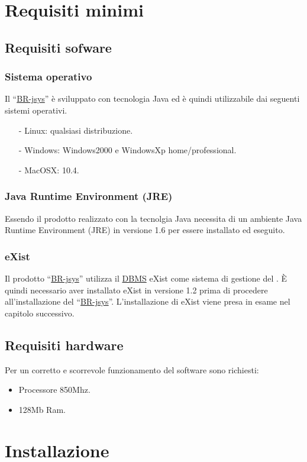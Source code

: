 \chapter{Requisiti minimi}
\section{Requisiti sofware }
\subsection{Sistema operativo}
Il ``\underline{BR-jsys}'' \`e sviluppato con tecnologia Java ed \`e quindi utilizzabile dai seguenti sistemi operativi.
\begin{itemize}
\item[-] Linux: qualsiasi distribuzione.
\item[-] Windows: Windows2000 e WindowsXp home/professional.
\item[-] MacOSX: 10.4.
\end{itemize}
\subsection{Java Runtime Environment (JRE)}
Essendo il prodotto realizzato con la tecnolgia Java necessita di un ambiente Java Runtime Environment (JRE) in versione 1.6 per essere installato ed eseguito.
\subsection{eXist}
Il prodotto ``\underline{BR-jsys}'' utilizza il \underline{DBMS} eXist come sistema di gestione del \rp. \`E quindi necessario aver installato eXist in versione 1.2 prima di procedere all'installazione del ``\underline{BR-jsys}''. L'installazione di eXist viene presa in esame nel capitolo successivo.
\section{Requisiti hardware}
Per un corretto e scorrevole funzionamento del software sono richiesti:
\begin{itemize}
\item Processore 850Mhz.
\item 128Mb Ram.
\end{itemize}

\chapter{Installazione}
